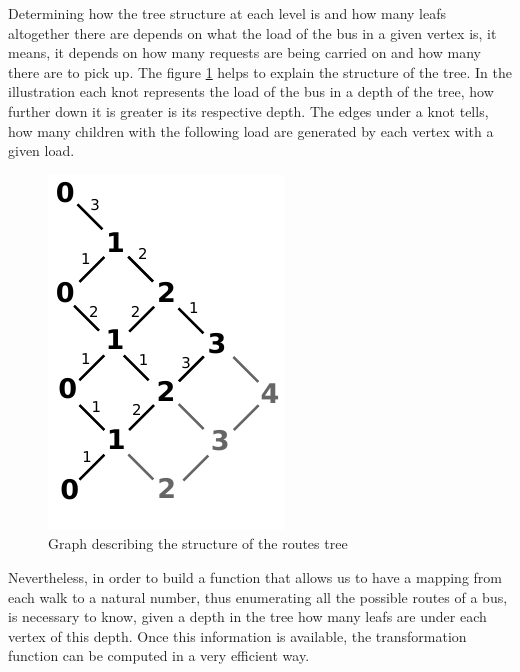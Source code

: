 \documentclass[tuberlin,cic,tc,openright,english,noabntcite]{iiufrgs}
\begin{document}
Determining how the tree structure at each level is and how many leafs altogether there are depends on what the load of the bus in a given vertex is, it means, it depends on how many requests are being carried on and how many there are to pick up. The figure \ref{fig:load_bus_scheme} helps to explain the structure of the tree. In the illustration each knot represents the load of the bus in a depth of the tree, how further down it is greater is its respective depth. The edges under a knot tells, how many children with the following load are generated by each vertex with a given load.

\begin{figure}[H]
    \caption{Graph describing the structure of the routes tree}
    \begin{center}
        \includegraphics{fig_load_bus_scheme}
    \end{center}
    \label{fig:load_bus_scheme}
\end{figure}

Nevertheless, in order to build a function that allows us to have a mapping from each walk to a natural number, thus enumerating all the possible routes of a bus, is necessary to know, given a depth in the tree how many leafs are under each vertex of this depth. Once this information is available, the transformation function can be computed in a very efficient way.
\end{document}

